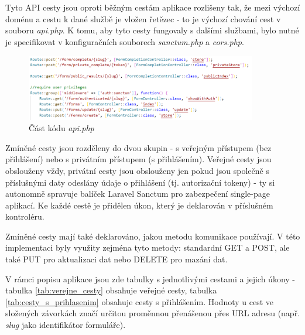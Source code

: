 	Tyto API cesty jsou oproti běžným cestám aplikace rozlišeny tak, že mezi výchozí doménu a cestu k dané službě je vložen řetězec \textit{} - to je výchozí chování cest v souboru \textit{api.php}. K tomu, aby tyto cesty fungovaly s dalšími službami, bylo nutné je specifikovat v konfiguračních souborech \textit{sanctum.php} a \textit{cors.php}.
	
	\begin{figure}[H]
		\centering %
		\includegraphics[width=0.9\textwidth]{img/routes/api_routes.png} %
		\caption{Část kódu \textit{api.php}} %
		\label{fig:routes_api} %
	\end{figure}
	
	Zmíněné cesty jsou rozděleny do dvou skupin - s veřejným přístupem (bez přihlášení) nebo s privátním přístupem (s přihlášením). Veřejné cesty jsou obslouženy vždy, privátní cesty jsou obslouženy jen pokud jsou společně s příslušnými daty odeslány údaje o přihlášení (tj. autorizační tokeny) - ty si autonomně spravuje balíček Laravel Sanctum pro zabezpečení single-page aplikací. Ke každé cestě je přidělen úkon, který je deklarován v příslušném kontroléru. 
	
	Zmíněné cesty mají také deklarováno, jakou metodu komunikace používají. V této implementaci byly využity zejména tyto metody: standardní GET a POST, ale také PUT pro aktualizaci dat nebo DELETE pro mazání dat.
	
	V rámci popisu aplikace jsou zde tabulky s jednotlivými cestami a jejich úkony - tabulka \ref{tab:verejne_cesty} obsahuje veřejné cesty, tabulka \ref{tab:cesty_s_prihlasenim} obsahuje cesty s přihlášením. Hodnoty u cest ve složených závorkách značí určitou proměnnou přenášenou přes URL adresu (např. \textit{slug} jako identifikátor formuláře).
	
